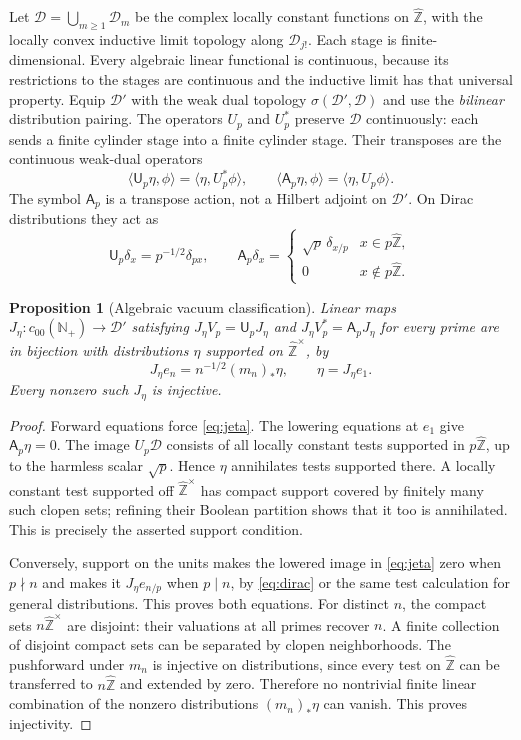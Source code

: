 \documentclass[11pt]{article}
\newtheorem{proposition}[theorem]{Proposition}
\theoremstyle{remark}
\newcommand{\N}{\mathbb N}
\newcommand{\Zhat}{\widehat{\mathbb Z}}
\newcommand{\D}{\mathcal D}
\begin{document}
Let $\D=\bigcup_{m\geq1}\D_m$ be the complex locally constant functions
on $\Zhat$, with the locally convex inductive limit topology along
$\D_{j!}$.  Each stage is finite-dimensional.  Every algebraic linear
functional is continuous, because its restrictions to the stages are
continuous and the inductive limit has that universal property.
Equip $\D'$ with the weak dual topology
$\sigma(\D',\D)$ and use the \emph{bilinear} distribution pairing.
The operators $U_p$ and $U_p^*$ preserve $\D$ continuously: each sends a
finite cylinder stage into a finite cylinder stage.  Their transposes
are the continuous weak-dual operators
\[
 \langle\mathsf U_p\eta,\phi\rangle=\langle\eta,U_p^*\phi\rangle,\qquad
 \langle\mathsf A_p\eta,\phi\rangle=\langle\eta,U_p\phi\rangle .
\]
The symbol $\mathsf A_p$ is a transpose action, not a Hilbert adjoint on
$\D'$.  On Dirac distributions they act as
\begin{equation}\label{eq:dirac}
 \mathsf U_p\delta_x=p^{-1/2}\delta_{px},\qquad
 \mathsf A_p\delta_x=
 \begin{cases}\sqrt p\,\delta_{x/p}&x\in p\Zhat,\\0&x\notin p\Zhat.\end{cases}
\end{equation}

\begin{proposition}[Algebraic vacuum classification]\label{prop:vacuum}
Linear maps $J_\eta:c_{00}(\N_+)\to\D'$ satisfying
$J_\eta V_p=\mathsf U_pJ_\eta$ and
$J_\eta V_p^*=\mathsf A_pJ_\eta$ for every prime are in bijection with
distributions $\eta$ supported on $\Zhat^\times$, by
\begin{equation}\label{eq:jeta}
 J_\eta e_n=n^{-1/2}(m_n)_*\eta,\qquad \eta=J_\eta e_1.
\end{equation}
Every nonzero such $J_\eta$ is injective.
\end{proposition}
\begin{proof}
Forward equations force \eqref{eq:jeta}.  The lowering equations at $e_1$
give $\mathsf A_p\eta=0$.  The image $U_p\D$ consists of all locally
constant tests supported in $p\Zhat$, up to the harmless scalar
$\sqrt p$.  Hence $\eta$ annihilates tests supported there.  A locally
constant test supported off $\Zhat^\times$ has compact support covered
by finitely many such clopen sets; refining their Boolean partition
shows that it too is annihilated.  This is precisely the asserted support
condition.

Conversely, support on the units makes the lowered image in
\eqref{eq:jeta} zero when $p\nmid n$ and makes it
$J_\eta e_{n/p}$ when $p\mid n$, by \eqref{eq:dirac} or the same test
calculation for general distributions.  This proves both equations.
For distinct $n$, the compact sets $n\Zhat^\times$ are disjoint: their
valuations at all primes recover $n$.  A finite collection of disjoint
compact sets can be separated by clopen neighborhoods.  The pushforward
under $m_n$ is injective on distributions, since every test on $\Zhat$
can be transferred to $n\Zhat$ and extended by zero.  Therefore no
nontrivial finite linear combination of the nonzero distributions
$(m_n)_*\eta$ can vanish.  This proves injectivity.
\end{proof}
\end{document}
